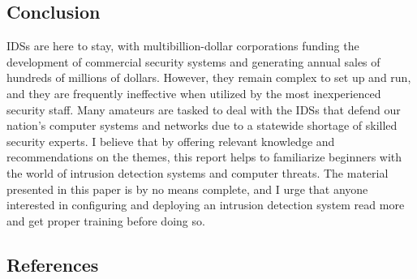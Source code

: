 \documentclass[12pt]{article}
\begin{document}
    \subsection{Conclusion}
    \par IDSs are here to stay, with multibillion-dollar corporations funding the development of commercial security systems and generating annual sales of hundreds of millions of dollars. However, they remain complex to set up and run, and they are frequently ineffective when utilized by the most inexperienced security staff. Many amateurs are tasked to deal with the IDSs that defend our nation's computer systems and networks due to a statewide shortage of skilled security experts. I believe that by offering relevant knowledge and recommendations on the themes, this report helps to familiarize beginners with the world of intrusion detection systems and computer threats. The material presented in this paper is by no means complete, and I urge that anyone interested in configuring and deploying an intrusion detection system read more and get proper training before doing so.
    
    \clearpage
    
    \cleardoublepage
    
   
    \begin{left}
    \huge{\section*{References}\label{sec:intro}}
    \end{left}
    
\end{document}
